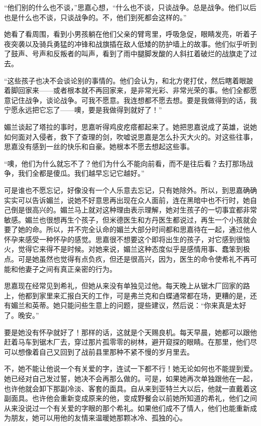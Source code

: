 \par “他们别的什么也不谈，”思嘉心想，“什么也不谈，只谈战争。总是战争。他们以后也是什么也不谈，只谈战争的。不，他们到死都会这样的。”
\par 她看了看周围，看到小男孩躺在他们父亲的臂弯里，呼吸急促，眼睛发亮，听着子夜突袭以及骑兵勇猛的冲锋和战旗插在敌人低矮的防护墙上的故事。他们似乎听到了鼓声、号声和反叛者的叫声，看到了雨中腿脚发酸的人斜扛着破烂的战旗走了过去。
\par “这些孩子也决不会谈论别的事情的。他们会认为，和北方佬打仗，然后瞎着眼跛着脚回家来——或者根本就不再回家来，是非常光彩、非常光荣的事。他们全都愿意记住战争，谈论战争。可我不愿意。我连想都不愿去想。要是我做得到的话，我宁愿永远把它忘了——噢，要是我做得到就好了！”
\par 媚兰谈起了塔拉的事时，思嘉听得鸡皮疙瘩都起来了。她把思嘉说成了英雄，说她如何面对入侵者，救下了查理的剑，吹嘘说思嘉是怎么扑灭大火的。对这些往事，思嘉没有感到一丝的快乐和自豪。她根本不愿去想起这些事。
\par “噢，他们为什么就忘不了？他们为什么不能向前看，而不是往后看？去打那场战争，我们全都是傻瓜。我们越早忘记它越好。”
\par 可是谁也不愿忘记，好像没有一个人乐意去忘记，只有她除外。所以，到思嘉确确实实可以告诉媚兰，说她不好意思再出现在众人面前，连在黑暗中也不行时，她自己倒是很高兴的。媚兰马上就对这种理由表示理解，她对生孩子的一切事宜都非常敏感。媚兰也很想再生个孩子，但米德医生和方丹医生都说过，再生一个小孩就会要了她的命。所以，并不完全认命的媚兰大部分时间都和思嘉待在一起，通过他人怀孕来感受一种怀孕的感觉。思嘉很不想要这个即将出生的孩子，对它感到很恼火，觉得它来得不是时候。对她来说，媚兰这种态度似乎是感情用事、蠢笨到极点。可是她虽然也觉得有点负疚，但还是很高兴，因为，医生的命令使希礼不再可能和他妻子之间有真正亲密的行为。
\par 思嘉现在经常见到希礼，但她从来没有单独见过他。每天晚上从锯木厂回家的路上，他都到家里来汇报白天的工作，可是弗兰克和白蝶通常都在场，更糟的是，还有媚兰和英蒂。她只能问些生意上的问题，提些建议，然后说：“你来真是太好了。晚安。”
\par 要是她没有怀孕就好了！那样的话，这就是个天赐良机。每天早晨，她都可以跟他赶着马车到锯木厂去，穿过那片孤零零的树林，避开窥探的眼睛。在那里，他们尽可以想像着自己又回到了战前县里那种不紧不慢的岁月里去。
\par 不，她不能让他说一个有关爱的字，连试一下都不行！她无论如何也不能提到爱。她已经对自己发过誓，她决不会再那么做的。可是，如果她再次单独跟他在一起，也许他就会卸下那副冷淡、客套的面具。自从来到亚特兰大以后，他就一直戴着这副面具。也许他会重新变成原来的他，变成野餐会以前她所知道的希礼，他们之间从来没说过一个有关爱的字眼的那个希礼。如果他们成不了情人，他们也能重新成为朋友，她可以用他的友情来温暖她那颗冰冷、孤独的心。
